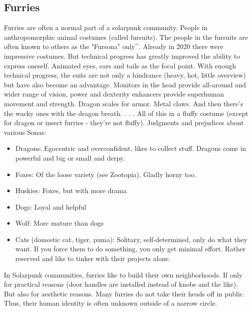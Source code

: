 \subsection{Furries}
Furries are often a normal part of a solarpunk community. People in anthropomorphic animal costumes (called fursuits). The people in the fursuits are often known to others as the "Fursona" only^.
Already in 2020 there were impressive costumes. But technical progress has greatly improved the ability to express oneself. Animated eyes, ears and tails as the focal point.
With enough technical progress, the suits are not only a hindrance (heavy, hot, little overview) but have also become an advantage. Monitors in the head provide all-around and wider range of vision, power and dexterity enhancers provide superhuman movement and strength. Dragon scales for armor. Metal claws. And then there's the wacky ones with the dragon breath. . . .
All of this in a fluffy costume (except for dragon or insect furries - they're not fluffy).
Judgments and prejudices about various Sonas: 

\begin{itemize}
    \item Dragons: Egocentric and overconfident, likes to collect stuff. Dragons come in powerful and big or small and derpy.
    \item Foxes: Of the loose variety (see Zootopia). Gladly horny too.
    \item Huskies: Foxes, but with more drama
    \item Dogs: Loyal and helpful
    \item Wolf: More mature than dogs
    \item Cats (domestic cat, tiger, puma): Solitary, self-determined, only do what they want. If you force them to do something, you only get minimal effort. Rather reserved and like to tinker with their projects alone.
\end{itemize}

In Solarpunk communities, furries like to build their own neighborhoods. If only for practical reasons (door handles are installed instead of knobs and the like). But also for aesthetic reasons.
Many furries do not take their heads off in public. Thus, their human identity is often unknown outside of a narrow circle.